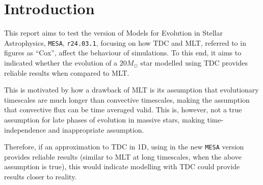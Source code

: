 \section{Introduction}\label{sec:Intro}
This report aims to test the version of Models for Evolution in Stellar Astrophysics, {\tt MESA}, {\tt r24.03.1}, focusing on how \gls{TDC} and \gls{MLT}, referred to in figures as ``Cox'', affect the behaviour of simulations. To this end, it aims to indicated whether the evolution of a $20M_{\odot}$ star modelled using \gls{TDC} provides reliable results when compared to \gls{MLT}. 

This is motivated by how a drawback of \gls{MLT} is its assumption that evolutionary timescales are much longer than convective timescales, making the assumption that convective flux can be time averaged valid. This is, however, not a true assumption for late phases of evolution in massive stars, making time-independence and inappropriate assumption. 

Therefore, if an approximation to \gls{TDC} in 1D, using in the new \texttt{MESA} version provides reliable results (similar to \gls{MLT} at long timescales, when the above assumption is true), this would indicate modelling with \gls{TDC} could provide results closer to reality.